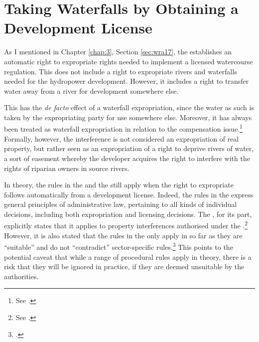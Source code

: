 \section{Taking Waterfalls by Obtaining a Development License}\label{sec:special}

As I mentioned in Chapter \ref{chap:3}, Section \ref{sec:wra17}, the \cite{wra17} establishes an automatic right to expropriate rights needed to implement a licensed watercourse regulation. This does not include a right to expropriate rivers and waterfalls needed for the hydropower development. However, it includes a right to transfer water away from a river for development somewhere else.

This has the {\it de facto} effect of a waterfall expropriation, since the water as such is taken by the expropriating party for use somewhere else. Moreover, it has always been treated as waterfall expropriation in relation to the compensation issue.\footnote{See \cite{jorpeland11}.} Formally, however, the interference is not considered an expropriation of real property, but rather seen as an expropriation of a right to deprive rivers of water, a sort of easement whereby the developer acquires the right to interfere with the rights of riparian owners in source rivers.

In theory, the rules in the \cite{ea59} and the \cite{paa67} still apply when the right to expropriate follows automatically from a development license. Indeed, the rules in the \cite{paa67} express general principles of administrative law, pertaining to all kinds of individual decisions, including both expropriation and licensing decisions. The \cite{ea59}, for its part, explicitly states that it applies to property interferences authorised under the \cite{wra17}.\footnote{See \cite[30]{ea59}.} However, it is also stated that the rules in the \cite{ea59} only apply in so far as they are ``suitable'' and do not ``contradict'' sector-specific rules.\footcite[30]{ea59} This points to the potential caveat that while a range of procedural rules apply in theory, there is a risk that they will be ignored in practice, if they are deemed unsuitable by the authorities.

